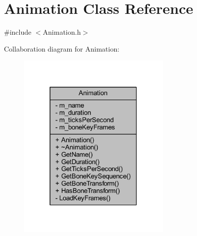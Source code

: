 \hypertarget{class_animation}{}\section{Animation Class Reference}
\label{class_animation}


{\ttfamily \#include $<$Animation.\+h$>$}



Collaboration diagram for Animation\+:\nopagebreak
\begin{figure}[H]
\begin{center}
\leavevmode
\includegraphics[width=211pt]{class_animation__coll__graph}
\end{center}
\end{figure}
